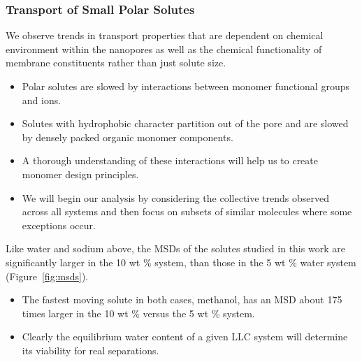 \documentclass{article}
\begin{document}
  \subsubsection*{Transport of Small Polar Solutes}\label{section:general_transport_solutes}  
  
  We observe trends in transport properties that are dependent on chemical 
  environment within the nanopores as well as the chemical functionality of membrane
  constituents rather than just solute size. 
  \begin{itemize}
    \item Polar solutes are slowed by interactions between monomer functional groups
    and ions.
    \item Solutes with hydrophobic character partition out of the pore and are 
    slowed by densely packed organic monomer components.
    \item A thorough understanding of these interactions will help us to create
    monomer design principles.
    \item We will begin our analysis by considering the collective trends observed  
    across all systems and then focus on subsets of similar molecules where 
    some exceptions occur. 
  \end{itemize}
  
  
  Like water and sodium above, the MSDs of the solutes studied in this work are 
  significantly larger in the 10 wt \% system, than those in the 5 wt \% water 
  system (Figure~\ref{fig:msds}). 
  \begin{itemize}
    \item The fastest moving solute in both cases, methanol, has an MSD about 175
    times larger in the 10 wt \% versus the 5 wt \% system.
    \item Clearly the equilibrium water content of a given LLC system will 
    determine its viability for real separations.
  \end{itemize} 
  
  
\end{document}

